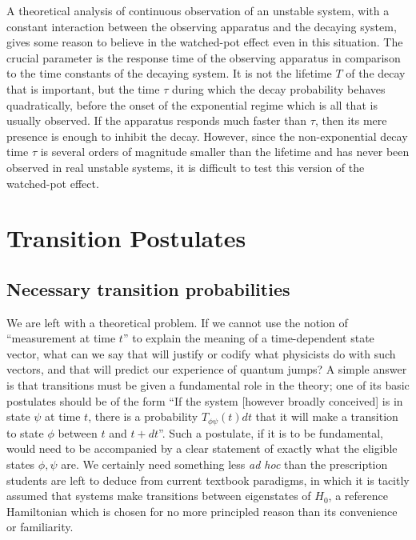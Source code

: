 \documentclass[12pt,a4paper,reqno]{article}
\renewcommand{\(}{\left(}
\renewcommand{\)}{\right)}
\newcommand{\<}{\langle}
\renewcommand{\>}{\rangle}
\theoremstyle{plain} %
\theoremstyle{definition}
\theoremstyle{remark}
\begin{document}
A theoretical analysis \cite{obsdecay} of continuous observation  of an
unstable system, with a constant interaction between the observing 
apparatus and the decaying system, gives some reason to believe in the
watched-pot  effect even in this situation. The crucial parameter is the
response time  of the observing apparatus in comparison to the time
constants of the  decaying system. It is not the lifetime $T$ of the
decay that is important, but the time $\tau$ during which the decay
probability behaves quadratically, before the onset of the exponential
regime which is all that is usually observed. If the  apparatus responds
much faster than $\tau$, then its mere presence is enough to inhibit the
decay. However, since  the non-exponential decay time $\tau$ is several
orders of magnitude smaller  than the lifetime and has never been
observed in real unstable systems,  it is difficult to test this version
of the watched-pot effect.


\section{Transition Postulates}

\subsection{Necessary transition probabilities}

 We are left with a theoretical problem. If we cannot use the notion of 
``measurement at time $t$'' to explain the meaning of a time-dependent 
state vector, what can we say that will justify or codify what physicists 
do with such vectors, and that will predict our experience of quantum 
jumps? A simple answer is that transitions must be given a fundamental 
role in the theory; one of its basic postulates should be of the form 
``If the system [however broadly conceived] is in state $\psi$ at time 
$t$, there is a probability $T_{\phi \psi}(t)dt$ that it will make a transition to 
state $\phi$ between $t$ and $t+dt$''. Such a postulate, if it is to be 
fundamental, would need to be accompanied by a clear statement of exactly 
what the eligible states $\phi, \psi$ are. We certainly need something 
less {\em ad hoc} than the prescription students are left to deduce from 
current textbook paradigms, in which it is tacitly assumed that systems make 
transitions between eigenstates of $H_0$, a reference Hamiltonian which 
is chosen for no more principled reason than its convenience or familiarity.
\end{document}
